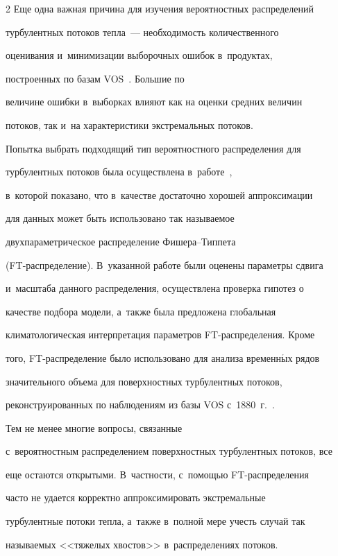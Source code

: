 \begin{multicols}{2}
Еще одна важная причина для изучения вероятностных распределений


турбулентных потоков теп\-ла~--- необходимость количественного


оценивания и~минимизации выборочных ошибок в~продуктах,


построенных по базам VOS~\cite{Gulev2007a,Gulev2007b}. Большие по


величине ошибки в~выборках влияют как на оценки средних величин


потоков, так и~на характеристики экстремальных потоков.








Попытка выбрать подходящий тип вероятностного распределения для


турбулентных потоков была осуществлена в~работе~\cite{Gulev2012}, 


в~которой показано, что в~качестве достаточно хорошей аппроксимации


для данных может быть использовано так назы\-ва\-емое


двухпараметрическое распределение Фи\-ше\-ра--Тип\-пе\-та


(FT-рас\-пре\-де\-ле\-ние). В~указанной работе были оценены параметры сдвига


и~масштаба данного распределения, осуществлена проверка гипотез о


качестве подбора модели, а~также была предложена глобальная


климатологическая интерпретация параметров FT-рас\-пре\-де\-ле\-ния. Кроме


того, FT-рас\-пре\-де\-ле\-ние было использовано для анализа временн$\acute{\mbox{ы}}$х рядов


значительного объема для поверхностных турбулентных потоков,


реконструированных по наблюдениям из базы VOS с~1880~г.~\cite{Gulev2013}. 


Тем не менее многие вопросы, связанные 


с~вероятностным распределением поверхностных турбулентных потоков, все


еще остаются открытыми. В~част\-ности, с~по\-мощью FT-рас\-пре\-де\-ле\-ния


часто не удается корректно аппроксимировать экстремальные


турбулентные потоки тепла, а~также в~полной мере учесть случай так


называемых <<тяжелых хвостов>> в~распределениях потоков.















\end{multicols}
